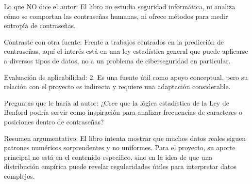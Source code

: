 \documentclass[12pt, letterpaper]{article}
\begin{document}
\noindent
Lo que NO dice el autor: El libro no estudia seguridad informática, ni analiza cómo se comportan las contraseñas humanas, ni ofrece métodos para medir entropía de contraseñas. \newline

\noindent
Contraste con otra fuente: Frente a trabajos centrados en la predicción de contraseñas, aquí el interés está en una ley estadística general que puede aplicarse a diversos tipos de datos, no a un problema de ciberseguridad en particular.   \newline 

\noindent
Evaluación de aplicabilidad: 2. Es una fuente útil como apoyo conceptual, pero su relación con el proyecto es indirecta y requiere una adaptación considerable. \newline

\noindent
Preguntas que le haría al autor: ¿Cree que la lógica estadística de la Ley de Benford podría servir como inspiración para analizar frecuencias de caracteres o posiciones dentro de contraseñas? \newline

\noindent
Resumen argumentativo: El libro intenta mostrar que muchos datos reales siguen patrones numéricos sorprendentes y no uniformes. Para el proyecto, su aporte principal no está en el contenido específico, sino en la idea de que una distribución empírica puede revelar regularidades útiles para interpretar datos complejos.
\end{document}
